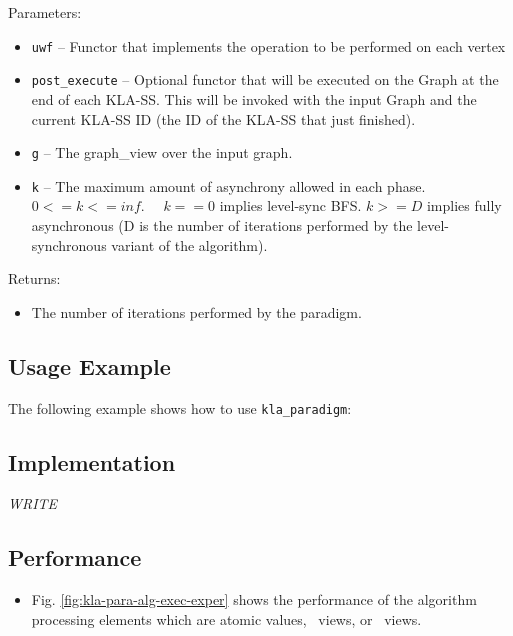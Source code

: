 Parameters:
\begin{itemize}
\item
\texttt{uwf} --
Functor that implements the operation to be performed on each vertex
\item
\texttt{post\_execute} --
Optional functor that will be executed on the Graph at the end of each KLA-SS. This will be invoked with the input Graph and the current KLA-SS ID (the ID of the KLA-SS that just finished).
\item
\texttt{g} --
The graph\_view over the input graph.
\item
\texttt{k} --
The maximum amount of asynchrony allowed in each phase. $0 <= k <= inf.$ \ \ $k == 0$ implies level-sync BFS. $k >= D$ implies fully asynchronous (D is the number of iterations performed by the level-synchronous variant of the algorithm).
\end{itemize}

Returns:
\begin{itemize}
\item
The number of iterations performed by the paradigm. 
\end{itemize}

\subsection{Usage Example} \label{sec-kla-alg-use}

The following example shows how to use 
\texttt{kla\_paradigm}:


\subsection{Implementation} \label{sec-kla-alg-impl}

\textit{WRITE}

\subsection{Performance} \label{sec-kla-alg-perf}

\begin{itemize}
\item
Fig. \ref{fig:kla-para-alg-exec-exper}
shows the performance of the algorithm processing
elements which are atomic values, \stl\ views, or \stapl\ views.
\end{itemize}

